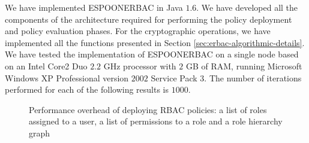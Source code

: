 \documentclass[epsfig,a4paper,11pt,titlepage]{book}
\numberwithin{algorithm}{chapter}
\begin{document}
We have implemented \gls{ESPOONERBAC} in Java $1.6$. We have developed all the components of the architecture required for performing the policy deployment and policy evaluation phases. For the cryptographic operations, we have implemented all the functions presented in Section \ref{sec:erbac-algorithmic-details}. We have tested the implementation of \gls{ESPOONERBAC} on a single node based on an Intel Core2 Duo $2.2$ GHz processor with $2$ GB of RAM, running Microsoft Windows XP Professional version $2002$ Service Pack $3$. The number of iterations performed for each of the following results is $1000$.

\begin{figure} [htp]
\centering
{}
\caption[Performance overhead of deploying RBAC policies]{Performance overhead of deploying \gls{RBAC} policies:  a list of roles assigned to a user,  a list of permissions to a role and  a role hierarchy graph}
\label{fig:erbac-policy-deployment-rbac-policy}
\end{figure}
\end{document}
